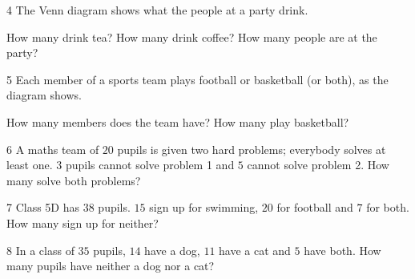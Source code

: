 \gap
\needspace{7.5cm}
\begin{probbox}{4}{\relax}
The Venn diagram shows what the people at a party drink.
\begin{center}
\end{center}
 How many drink tea? \quad {} How many drink coffee? \quad {} How many people are at the party?
\end{probbox}
\gap
\needspace{7.5cm}
\begin{probbox}{5}{\relax}
Each member of a sports team plays football or basketball (or both), as the diagram shows.
\begin{center}
\end{center}
 How many members does the team have? \quad {} How many play basketball?
\end{probbox}
\gap
\begin{probbox}{6}{\relax}
A maths team of $20$ pupils is given two hard problems; everybody solves at least one. $3$ pupils cannot solve problem 1 and $5$ cannot solve problem 2. How many solve both problems?
\end{probbox}
\gap
\begin{probbox}{7}{\relax}
Class 5D has $38$ pupils. $15$ sign up for swimming, $20$ for football and $7$ for both. How many sign up for neither?
\end{probbox}
\gap
\begin{probbox}{8}{\relax}
In a class of $35$ pupils, $14$ have a dog, $11$ have a cat and $5$ have both. How many pupils have neither a dog nor a cat?
\end{probbox}
